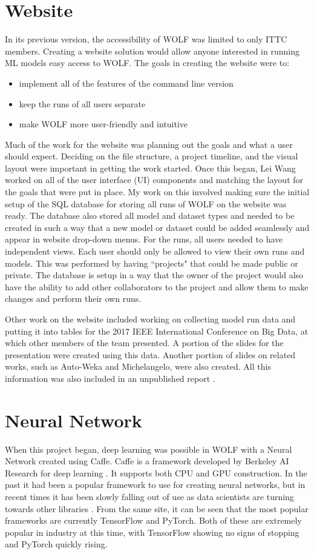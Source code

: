 \section*{Website}
In its previous version, the accessibility of WOLF was limited to only ITTC members. Creating a website solution would allow anyone interested in running ML models easy access to WOLF. The goals in creating the website were to:
\begin{itemize}
	\item implement all of the features of the command line version
	\item keep the runs of all users separate
	\item make WOLF more user-friendly and intuitive
\end{itemize}

Much of the work for the website was planning out the goals and what a user should expect. Deciding on the file structure, a project timeline, and the visual layout were important in getting the work started. Once this began, Lei Wang worked on all of the user interface (UI) components and matching the layout for the goals that were put in place. My work on this involved making sure the initial setup of the SQL database for storing all runs of WOLF on the website was ready. The database also stored all model and dataset types and needed to be created in such a way that a new model or dataset could be added seamlessly and appear in website drop-down menus. For the runs, all users needed to have independent views. Each user should only be allowed to view their own runs and models. This was performed by having ``projects" that could be made public or private. The database is setup in a way that the owner of the project would also have the ability to add other collaborators to the project and allow them to make changes and perform their own runs.

Other work on the website included working on collecting model run data and putting it into tables for the 2017 IEEE International Conference on Big Data, at which other members of the team presented. A portion of the slides for the presentation \parencite{WOLFpresentation} were created using this data. Another portion of slides on related works, such as Auto-Weka and Michelangelo, were also created. All this information was also included in an unpublished report \parencite{WOLFpaper}.
\section*{Neural Network}
When this project began, deep learning was possible in WOLF with a Neural Network created using Caffe. Caffe is a framework developed by Berkeley AI Research for deep learning \parencite{Caffe}. It supports both CPU and GPU construction. In the past it had been a popular framework to use for creating neural networks, but in recent times it has been slowly falling out of use as data scientists are turning towards other libraries \parencite{NNrankings}. From the same site, it can be seen that the most popular frameworks are currently TensorFlow and PyTorch. Both of these are extremely popular in industry at this time, with TensorFlow showing no signs of stopping and PyTorch quickly rising.

